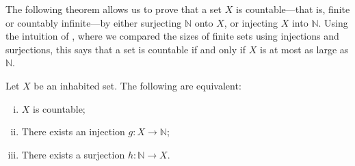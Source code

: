 The following theorem allows us to prove that a set $X$ is countable---that is, finite or countably infinite---by either surjecting $\mathbb{N}$ onto $X$, or injecting $X$ into $\mathbb{N}$. Using the intuition of , where we compared the sizes of finite sets using injections and surjections, this says that a set is countable if and only if $X$ is at most as large as $\mathbb{N}$.

\begin{theorem}
\label{thmCountableFromInjSurj}
Let $X$ be an inhabited set. The following are equivalent:
\begin{enumerate}[(i)]
\item $X$ is countable;
\item There exists an injection $g : X \to \mathbb{N}$;
\item There exists a surjection $h : \mathbb{N} \to X$.
\end{enumerate}
\end{theorem}

